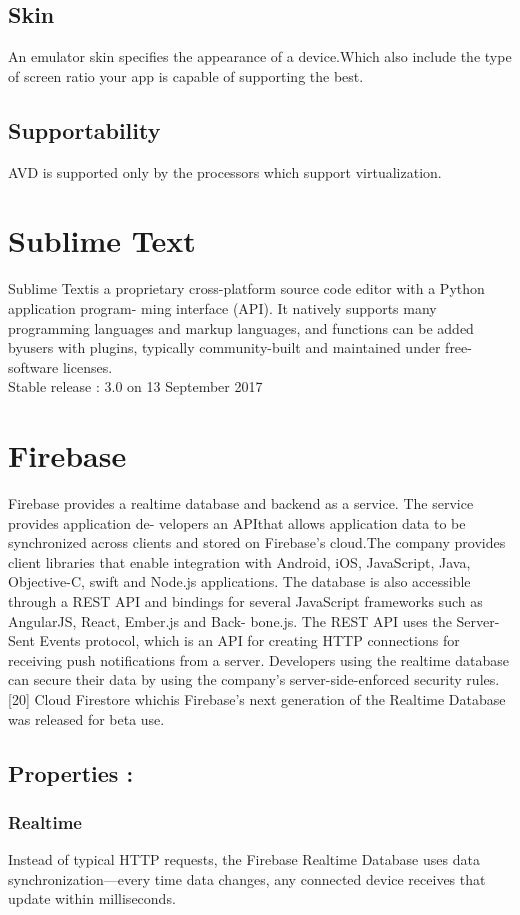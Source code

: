 \subsection{Skin}
An emulator skin specifies the appearance of a device.Which also include the type of screen ratio your app is capable of supporting the best.


\subsection{Supportability}
AVD is supported only by the processors which support virtualization.

\section{Sublime Text}
Sublime Textis a proprietary cross-platform source code editor with a Python application program- ming interface (API). It natively supports many programming languages and markup languages, and functions can be added byusers with plugins, typically community-built and maintained under free- software licenses.\\
Stable release : 3.0 on 13 September 2017

\section{Firebase}
Firebase provides a realtime database and backend as a service. The service provides application de- velopers an APIthat allows application data to be synchronized across clients and stored on Firebase’s cloud.The company provides client libraries that enable integration with Android, iOS, JavaScript, Java, Objective-C, swift and Node.js applications. The database is also accessible through a REST API and bindings for several JavaScript frameworks such as AngularJS, React, Ember.js and Back- bone.js. The REST API uses the Server-Sent Events protocol, which is an API for creating HTTP connections for receiving push notifications from a server. Developers using the realtime database can secure their data by using the company’s server-side-enforced security rules.[20] Cloud Firestore whichis Firebase’s next generation of the Realtime Database was released for beta use.

\subsection{Properties :}
\subsubsection{Realtime}
Instead of typical HTTP requests, the Firebase Realtime Database uses data synchronization—every time data changes, any connected device receives that update within milliseconds.
